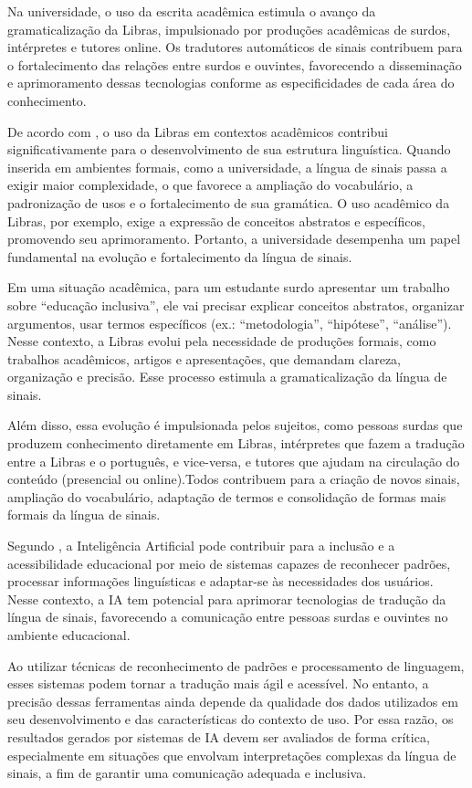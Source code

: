 \documentclass[portuguese]{textolivre}
\begin{document}
Na universidade, o uso da escrita acadêmica estimula o avanço da gramaticalização da Libras, impulsionado por produções acadêmicas de surdos, intérpretes e tutores online. Os tradutores automáticos de sinais contribuem para o fortalecimento das relações entre surdos e ouvintes, favorecendo a disseminação e aprimoramento dessas tecnologias conforme as especificidades de cada área do conhecimento.

De acordo com \textcite{QuadrosKarnopp2004,Skliar1998}, o uso da Libras em contextos acadêmicos contribui significativamente para o desenvolvimento de sua estrutura linguística. Quando inserida em ambientes formais, como a universidade, a língua de sinais passa a exigir maior complexidade, o que favorece a ampliação do vocabulário, a padronização de usos e o fortalecimento de sua gramática. O uso acadêmico da Libras, por exemplo, exige a expressão de conceitos abstratos e específicos, promovendo seu aprimoramento. Portanto, a universidade desempenha um papel fundamental na evolução e fortalecimento da língua de sinais.

Em uma situação acadêmica, para um estudante surdo apresentar um trabalho sobre “educação inclusiva”, ele vai precisar explicar conceitos abstratos, organizar argumentos, usar termos específicos (ex.: “metodologia”, “hipótese”, “análise”). Nesse contexto, a Libras evolui pela necessidade de produções formais, como trabalhos acadêmicos, artigos e apresentações, que demandam clareza, organização e precisão. Esse processo estimula a gramaticalização da língua de sinais.

Além disso, essa evolução é impulsionada pelos sujeitos, como pessoas surdas que produzem conhecimento diretamente em Libras, intérpretes que fazem a tradução entre a Libras e o português, e vice-versa, e tutores que ajudam na circulação do conteúdo (presencial ou online).Todos contribuem para a criação de novos sinais, ampliação do vocabulário, adaptação de termos e consolidação de formas mais formais da língua de sinais.

Segundo \textcite{HolmesPorayskaPomsta2023}, a Inteligência Artificial pode contribuir para a inclusão e a acessibilidade educacional por meio de sistemas capazes de reconhecer padrões, processar informações linguísticas e adaptar-se às necessidades dos usuários. Nesse contexto, a IA tem potencial para aprimorar tecnologias de tradução da língua de sinais, favorecendo a comunicação entre pessoas surdas e ouvintes no ambiente educacional.

Ao utilizar técnicas de reconhecimento de padrões e processamento de linguagem, esses sistemas podem tornar a tradução mais ágil e acessível. No entanto, a precisão dessas ferramentas ainda depende da qualidade dos dados utilizados em seu desenvolvimento e das características do contexto de uso. Por essa razão, os resultados gerados por sistemas de IA devem ser avaliados de forma crítica, especialmente em situações que envolvam interpretações complexas da língua de sinais, a fim de garantir uma comunicação adequada e inclusiva.
\end{document}
